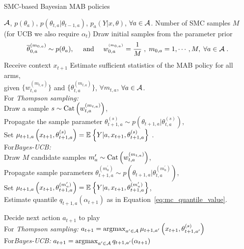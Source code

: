 \begin{algorithm}
	\caption{SMC-based Bayesian MAB policies}
	\label{alg:sir-mab}
	\begin{algorithmic}[1]
		\REQUIRE $\mathcal{A}$, $p(\theta_a)$, $p(\theta_{t,a}|\theta_{t-1,a})$, $p_a(Y|x,\theta)$, $\forall a \in \mathcal{A}$.
		\REQUIRE Number of SMC samples $M$ (for UCB we also require $\alpha_t$)
		\STATE Draw initial samples from the parameter prior
			\vspace*{-1ex}
		\begin{equation}
			\overline{\theta}_{0,a}^{(m_{0,a})} \sim p(\theta_a), \quad \text{ and } \quad w_{0,a}^{^{(m_{0,a})}}=\frac{1}{M} \;, \; m_{0,a}=1,\cdots, M, \; \forall a \in \A \;.
			\nonumber
			\vspace*{-4ex}
		\end{equation}
		\STATE Receive context $x_{t+1}$
		\STATE Estimate sufficient statistics of the MAB policy for all arms, \\
		given $\{w_{t,a}^{(m_{t,a})} \}$ and $\{\theta_{t,a}^{(m_{t,a})}\}$, $\forall m_{t,a}$, $\forall a\in\mathcal{A}$.\\
		
		\vspace*{1ex}
		\quad For \textit{Thompson sampling:}\\
		\qquad Draw a sample $s \sim {\rm Cat}\left( w_{t,a}^{(m_{t,a})}\right)$, \\
		\qquad Propagate the sample parameter $\theta_{t+1,a}^{(s)}\sim p\left(\theta_{t+1,a}|\theta_{t,a}^{(s)}\right)$, \\
		\qquad Set $\mu_{t+1,a}\left(x_{t+1}, \theta_{t+1,a}^{(s)}\right)=\mathbb{E}_{}\left\{ Y|a,x_{t+1}, \theta_{t+1,a}^{(s)} \right\}$ .\\
		
		\vspace*{1ex}
		\quad For\textit{Bayes-UCB:}\\
		\qquad Draw $M$ candidate samples $m_{a}^\prime \sim {\rm Cat}\left( w_{t,a}^{(m_{t,a})}\right)$,\\
		\qquad Propagate sample parameters $\theta_{t+1,a}^{(m_{a}^\prime)} \sim p\left(\theta_{t+1,a}|\theta_{t,a}^{(m_{a}^\prime)}\right)$, \\
		\qquad Set $\mu_{t+1,a}\left(x_{t+1}, \theta_{t+1,a}^{(m_{a}^\prime)}\right)=\mathbb{E}_{}\left\{ Y|a,x_{t+1}, \theta_{t+1,a}^{(m_{a}^\prime)} \right\}$,\\
		\qquad Estimate quantile $q_{t+1,a}(\alpha_{t+1})$ as in Equation~\eqref{eq:mc_quantile_value}.
		
		\vspace*{1ex}
		\ENDFOR
		\STATE Decide next action $a_{t+1}$ to play\\
		\vspace*{1ex}
		\quad For \textit{Thompson sampling:} \hspace*{0.6cm} $a_{t+1}=\mathop{\mathrm{argmax}}_{a^\prime \in \mathcal{A}} \mu_{t+1,a^\prime}\left(x_{t+1}, \theta_{t+1,a^\prime}^{(s)}\right)$ \\
		\vspace*{1ex}
		\quad For\textit{Bayes-UCB:} \hspace*{1.8cm} $a_{t+1}=\mathop{\mathrm{argmax}}_{a^\prime \in \mathcal{A}}q_{t+1,a^\prime}(\alpha_{t+1})$
		

\end{algorithmic}
\end{algorithm}
